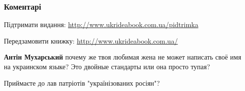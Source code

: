  
 
 
 
 
\subsubsection{Коментарі}
\label{sec:23_07_2021.fb.muharskij_antin.1.zrosijscheni.cmt}

\begin{itemize}
 
Підтримати видання: \url{http://www.ukrideabook.com.ua/pidtrimka} 

Передзамовити книжку: \url{http://www.ukrideabook.com.ua/}

\begin{itemize}
 
\textbf{Антін Мухарський} 
почему же твоя любимая жена не может написать своё имя на украинском языке? Это
двойные стандарты или она просто тупая?
\end{itemize}

 
Приймаєте до лав патріотів "українізованих росіян"?

\begin{itemize}
 

\end{itemize}
\end{itemize}
